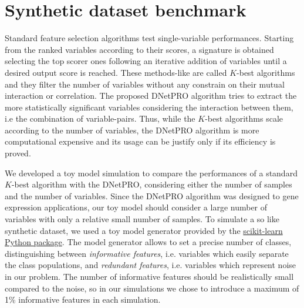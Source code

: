 \documentclass{standalone}
\begin{document}
\section[Toy Model]{Synthetic dataset benchmark}\label{dnetpro:toy}

Standard feature selection algorithms test single-variable performances.
Starting from the ranked variables according to their scores, a signature is obtained selecting the top scorer ones following an iterative addition of variables until a desired output score is reached.
These methods-like are called $K$-best algorithms and they filter the number of variables without any constrain on their mutual interaction or correlation.
The proposed \textsf{DNetPRO} algorithm tries to extract the more statistically significant variables considering the interaction between them, i.e the combination of variable-pairs.
Thus, while the $K$-best algorithms scale according to the number of variables, the \textsf{DNetPRO} algorithm is more computational expensive and its usage can be justify only if its efficiency is proved.

We developed a toy model simulation to compare the performances of a standard $K$-best algorithm with the \textsf{DNetPRO}, considering either the number of samples and the number of variables.
Since the \textsf{DNetPRO} algorithm was designed to gene expression applications, our toy model should consider a large number of variables with only a relative small number of samples.
To simulate a so like synthetic dataset, we used a toy model generator provided by the \href{https://scikit-learn.org/stable/modules/generated/sklearn.datasets.make_classification.html}{\textsf{scikit-learn Python} package}.
The model generator allows to set a precise number of classes, distinguishing between \emph{informative features}, i.e. variables which easily separate the class populations, and \emph{redundant features}, i.e. variables which represent noise in our problem.
The number of informative features should be realistically small compared to the noise, so in our simulations we chose to introduce a maximum of 1\% informative features in each simulation.
\end{document}
